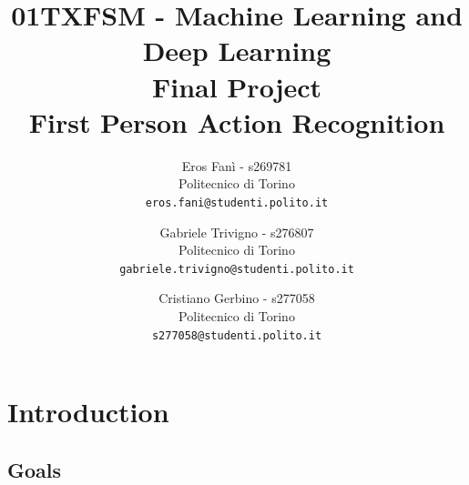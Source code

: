 \documentclass[10pt,twocolumn,hidelinks,letterpaper]{article}
\begin{document}
\title{01TXFSM - Machine Learning and Deep Learning \\
\vspace{0.3in}
Final Project \\
First Person Action Recognition}

\author{
  Eros Fanì - s269781\\
  Politecnico di Torino\\
  {\tt\small eros.fani@studenti.polito.it}
  \and
  Gabriele Trivigno - s276807\\
  Politecnico di Torino\\
  {\tt\small gabriele.trivigno@studenti.polito.it}
  \and
  Cristiano Gerbino - s277058\\
  Politecnico di Torino\\
  {\tt\small s277058@studenti.polito.it}
}

\maketitle


\newcommand{\quotes}[1]{“#1”}
\newcommand{\reff}[1]{Figure \ref{#1}}
\setlength{\parindent}{0pt}
\setlength{\parskip}{1em}

\begin{abstract}


\end{abstract}

\section{Introduction}

\subsection{Goals}
\end{document}
